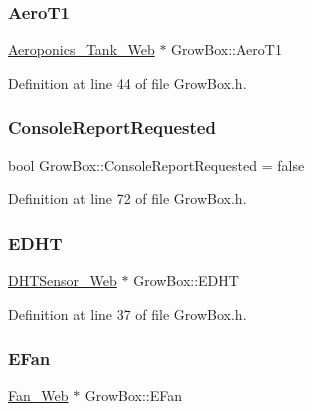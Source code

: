\mbox{\label{class_grow_box_a64282db7278b656dc7fdc0e0324f1f39}} 
\subsubsection{\texorpdfstring{Aero\+T1}{AeroT1}}
{\footnotesize\ttfamily \hyperlink{class_aeroponics___tank___web}{Aeroponics\+\_\+\+Tank\+\_\+\+Web} $\ast$ Grow\+Box\+::\+Aero\+T1}



Definition at line 44 of file Grow\+Box.\+h.

\mbox{\label{class_grow_box_aef5b0e1a50bdc88a89b84c8106e65df2}} 
\subsubsection{\texorpdfstring{Console\+Report\+Requested}{ConsoleReportRequested}}
{\footnotesize\ttfamily bool Grow\+Box\+::\+Console\+Report\+Requested = false\hspace{0.3cm}{\ttfamily [protected]}}



Definition at line 72 of file Grow\+Box.\+h.

\mbox{\label{class_grow_box_a64d390b3296d48bdc7a14c1165dd745b}} 
\subsubsection{\texorpdfstring{E\+D\+HT}{EDHT}}
{\footnotesize\ttfamily \hyperlink{class_d_h_t_sensor___web}{D\+H\+T\+Sensor\+\_\+\+Web} $\ast$ Grow\+Box\+::\+E\+D\+HT}



Definition at line 37 of file Grow\+Box.\+h.

\mbox{\label{class_grow_box_a87780b88d908225de993eecd8a54950c}} 
\subsubsection{\texorpdfstring{E\+Fan}{EFan}}
{\footnotesize\ttfamily \hyperlink{class_fan___web}{Fan\+\_\+\+Web} $\ast$ Grow\+Box\+::\+E\+Fan}



